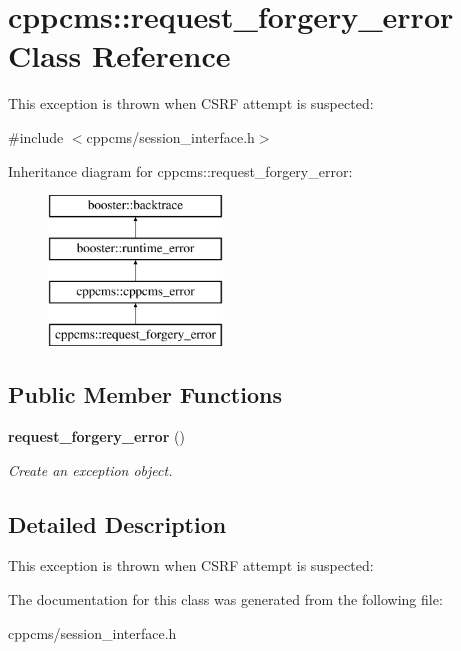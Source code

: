 \section{cppcms\-:\-:request\-\_\-forgery\-\_\-error \-Class \-Reference}
\label{classcppcms_1_1request__forgery__error}


\-This exception is thrown when \-C\-S\-R\-F attempt is suspected\-:  




{\ttfamily \#include $<$cppcms/session\-\_\-interface.\-h$>$}

\-Inheritance diagram for cppcms\-:\-:request\-\_\-forgery\-\_\-error\-:\begin{figure}[H]
\begin{center}
\leavevmode
\includegraphics[height=4.000000cm]{classcppcms_1_1request__forgery__error}
\end{center}
\end{figure}
\subsection*{\-Public \-Member \-Functions}
\begin{DoxyCompactItemize}
\item 
{\bf request\-\_\-forgery\-\_\-error} ()\label{classcppcms_1_1request__forgery__error_aa9780eb84d19376a1f92e6db320eb902}

\begin{DoxyCompactList}\small\item\em \-Create an exception object. \end{DoxyCompactList}\end{DoxyCompactItemize}


\subsection{\-Detailed \-Description}
\-This exception is thrown when \-C\-S\-R\-F attempt is suspected\-: 

\-The documentation for this class was generated from the following file\-:\begin{DoxyCompactItemize}
\item 
cppcms/session\-\_\-interface.\-h\end{DoxyCompactItemize}
